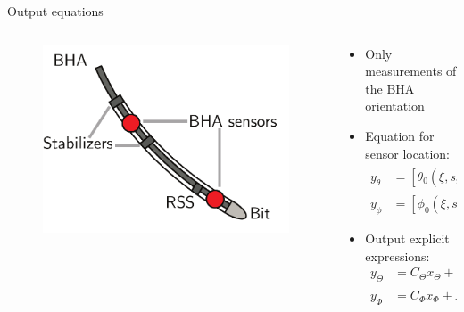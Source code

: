 \documentclass{beamer}
\begin{document}
\begin{frame}{Output equations}
\begin{columns}[T]
		\hspace{1cm}\begin{column}{0.45\textwidth}
		\vspace{1.5cm}	\begin{figure}[ht]\centering
				\includegraphics[width=1.1\textwidth]{images/Sensors.pdf}
			\end{figure}
		\end{column}
		\begin{column}{0.45\textwidth}
			\begin{itemize}\setlength\itemsep{1.5em}
				\item Only measurements of the BHA orientation
				\item Equation for sensor location:
				\begin{align*}
				y_{\theta}&=[\theta_0(\xi, s_{m,1}),\; \theta_2(\xi, s_{m,2})]^T \\
				y_{\phi}&=[\phi_0(\xi, s_{m,1}),\; \phi_2(\xi, s_{m,2})]^T
				\end{align*}
				\item Output explicit expressions:
				\begin{align*}
				y_\Theta &= C_\Theta x_\Theta + D_\Theta \Gamma_\Theta + W_y \\
				y_\Phi &= C_\Phi x_\Phi + D_\Phi \frac{\Gamma_\Phi}{\sin \Theta}		
				\end{align*}	
			\end{itemize}
		\end{column}
\end{columns}
\end{frame}
\end{document}
